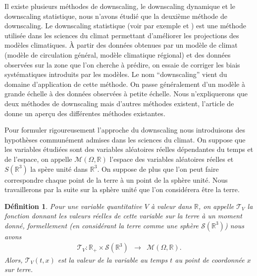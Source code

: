 \documentclass[a4paper,11pt]{article}
\numberwithin{equation}{section}
\newtheorem{definition}{Définition}
\begin{document}
\vspace{0.7cm}

Il existe plusieurs méthodes de downscaling, le downscaling dynamique et le downscaling statistique, nous n'avons étudié que la deuxième méthode de downscaling. Le downscaling statistique (voir par exemple \cite{vrac2012dynamical} et \cite{ayar2016intercomparison}) est une méthode utilisée dans les sciences du climat permettant d'améliorer les projections des modèles climatiques. À partir des données obtenues par un modèle de climat (modèle de circulation général, modèle climatique régional) et des données observées sur la zone que l'on cherche à prédire, on essaie de corriger les biais systématiques introduits par les modèles. Le nom ``downscaling'' vient du domaine d'application de cette méthode. On passe généralement d'un modèle à grande échelle à des données observées à petite échelle. Nous n'expliquerons que deux méthodes de downscaling mais d'autres méthodes existent, l'article de \cite{ayar2016intercomparison} donne un aperçu des différentes méthodes existantes.

\vspace{0.7cm}

Pour formuler rigoureusement l'approche du downscaling nous introduisons des hypothèses communément admises dans les sciences du climat. On suppose que les variables étudiées sont des variables aléatoires réelles dépendantes du temps et de l'espace, on appelle $\mathcal{M}(\Omega,\mathbb{R})$ l'espace des variables aléatoires réelles et $S(\mathbb{R}^3)$ la spère unité dans $\mathbb{R}^3$. On suppose de plus que l'on peut faire correspondre chaque point de la terre à un point de la sphère unité. Nous travaillerons par la suite sur la sphère unité que l'on considérera être la terre.

\begin{definition}
	\label{terre}
	Pour une variable quantitative $V$ à valeur dans $\mathbb{R}$, on appelle $\mathcal{T}_V$ la fonction donnant les  valeurs réelles de cette variable sur la terre à un moment donné, formellement (en considérant la terre comme une sphère $\mathcal{S}(\mathbb{R}^3)$) nous avons
	\begin{equation}
		\label{eq-terre-mod}
		\begin{array}{ccc}
			\mathcal{T}_V: \mathbb{R}_{+}\times\mathcal{S}(\mathbb{R}^{3}) & \to & \mathcal{M}(\Omega,\mathbb{R}).
		\end{array}
	\end{equation}
	Alors, $\mathcal{T}_V(t,x)$ est la valeur de la variable au temps $t$ au point de coordonnée $x$ sur terre.	
\end{definition}
\end{document}

